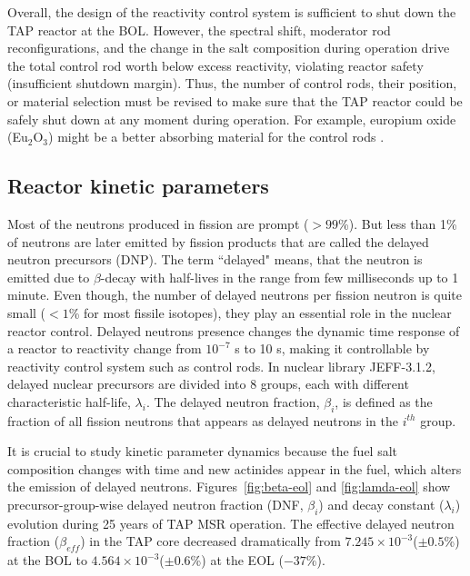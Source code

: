 Overall, the design of the reactivity control system is sufficient to shut 
down the \gls{TAP} reactor at the \gls{BOL}. However, the spectral shift, 
moderator rod reconfigurations, and the change in the salt composition during 
operation drive the total control rod worth below excess reactivity, violating 
reactor safety (insufficient shutdown margin). Thus, the number of control 
rods, their position, or material selection must be revised to make sure that 
the \gls{TAP} reactor could be safely shut down at any moment during 
operation. For example, europium oxide (Eu$_2$O$_3$) might be a better 
absorbing material for the control rods \cite{ashraf_preliminary_2020}.


\subsection{Reactor kinetic parameters}
Most of the neutrons produced in fission are prompt ($>99$\%). But less than 
1\% of neutrons are later emitted by fission products that are called the 
delayed neutron precursors (DNP). The term ``delayed" means, that the neutron 
is emitted due to $\beta$-decay with half-lives in the range from few 
milliseconds up to 1 minute. Even though, the number of delayed neutrons per 
fission neutron is quite small ($<1$\% for most fissile isotopes), they play 
an essential role in the nuclear reactor control. Delayed neutrons presence 
changes the dynamic time response of a reactor to reactivity change from 
$10^{-7}$ s to 10 s, making it controllable by reactivity control system such 
as control rods. In nuclear library JEFF-3.1.2, delayed nuclear precursors are 
divided into 8 groups, each with different characteristic half-life, 
$\lambda_i$. The delayed neutron fraction, $\beta_i$, is defined as the 
fraction of all fission neutrons that appears as delayed neutrons in the 
$i^{th}$ group.

It is crucial to study kinetic parameter dynamics because the fuel salt 
composition changes with time and new actinides appear in the fuel, which 
alters the emission of delayed neutrons. Figures~\ref{fig:beta-eol} 
and \ref{fig:lamda-eol} show precursor-group-wise delayed neutron fraction 
(DNF, $\beta_i$) and decay constant ($\lambda_i$) evolution during 25 years of 
\gls{TAP} \gls{MSR} operation. The effective delayed neutron fraction 
($\beta_{eff}$) in the \gls{TAP} core decreased dramatically from 
$7.245\times10^{-3}$($\pm0.5$\%) at the \gls{BOL} to 
$4.564\times10^{-3}$($\pm0.6$\%) at the \gls{EOL} ($-37$\%). 

